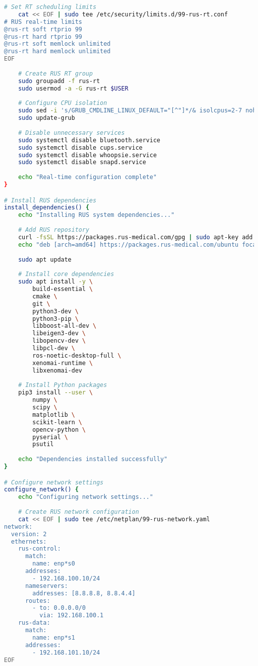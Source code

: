 \begin{lstlisting}[language=bash, caption={Operating System Installation Script}, label={lst:app-os-setup}]
    # Set RT scheduling limits
    cat << EOF | sudo tee /etc/security/limits.d/99-rus-rt.conf
# RUS real-time limits
@rus-rt soft rtprio 99
@rus-rt hard rtprio 99
@rus-rt soft memlock unlimited
@rus-rt hard memlock unlimited
EOF
    
    # Create RUS RT group
    sudo groupadd -f rus-rt
    sudo usermod -a -G rus-rt $USER
    
    # Configure CPU isolation
    sudo sed -i 's/GRUB_CMDLINE_LINUX_DEFAULT="[^"]*/& isolcpus=2-7 nohz_full=2-7 rcu_nocbs=2-7/' /etc/default/grub
    sudo update-grub
    
    # Disable unnecessary services
    sudo systemctl disable bluetooth.service
    sudo systemctl disable cups.service
    sudo systemctl disable whoopsie.service
    sudo systemctl disable snapd.service
    
    echo "Real-time configuration complete"
}

# Install RUS dependencies
install_dependencies() {
    echo "Installing RUS system dependencies..."
    
    # Add RUS repository
    curl -fsSL https://packages.rus-medical.com/gpg | sudo apt-key add -
    echo "deb [arch=amd64] https://packages.rus-medical.com/ubuntu focal main" | sudo tee /etc/apt/sources.list.d/rus.list
    
    sudo apt update
    
    # Install core dependencies
    sudo apt install -y \
        build-essential \
        cmake \
        git \
        python3-dev \
        python3-pip \
        libboost-all-dev \
        libeigen3-dev \
        libopencv-dev \
        libpcl-dev \
        ros-noetic-desktop-full \
        xenomai-runtime \
        libxenomai-dev
    
    # Install Python packages
    pip3 install --user \
        numpy \
        scipy \
        matplotlib \
        scikit-learn \
        opencv-python \
        pyserial \
        psutil
    
    echo "Dependencies installed successfully"
}

# Configure network settings
configure_network() {
    echo "Configuring network settings..."
    
    # Create RUS network configuration
    cat << EOF | sudo tee /etc/netplan/99-rus-network.yaml
network:
  version: 2
  ethernets:
    rus-control:
      match:
        name: enp*s0
      addresses:
        - 192.168.100.10/24
      nameservers:
        addresses: [8.8.8.8, 8.8.4.4]
      routes:
        - to: 0.0.0.0/0
          via: 192.168.100.1
    rus-data:
      match:
        name: enp*s1
      addresses:
        - 192.168.101.10/24
EOF
    

\end{lstlisting}
